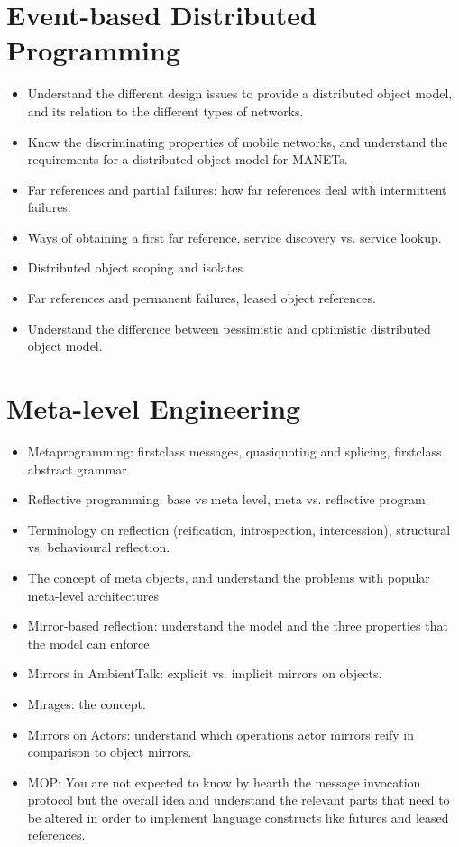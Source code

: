 \documentclass[a4paper]{report}
\begin{document}
\chapter{Event-based Distributed Programming}
\begin{itemize}
  \item Understand the different design issues to provide a distributed object model, and its
  relation to the different types of networks.
  \item Know the discriminating properties of mobile networks, and understand the
  requirements for a distributed object model for MANETs.
  \item Far references and partial failures: how far references deal with intermittent failures.
  \item Ways of obtaining a first far reference, service discovery vs. service lookup.
  \item Distributed object scoping and isolates.
  \item Far references and permanent failures, leased object references.
  \item Understand the difference between pessimistic and optimistic distributed object model.
\end{itemize}


\chapter{Meta-level Engineering}
\begin{itemize}
  \item Metaprogramming: firstclass messages, quasiquoting and splicing, firstclass abstract
  grammar
  \item Reflective programming: base vs meta level, meta vs. reflective program.
  \item Terminology on reflection (reification, introspection, intercession), structural vs.
  behavioural reflection.
  \item The concept of meta objects, and understand the problems with popular meta-level
  architectures
  \item Mirror-based reflection: understand the model and the three properties that the model
  can enforce.
  \item Mirrors in AmbientTalk: explicit vs. implicit mirrors on objects.
  \item Mirages: the concept.
  \item Mirrors on Actors: understand which operations actor mirrors reify in comparison to
  object mirrors.
  \item MOP: You are not expected to know by hearth the message invocation protocol but
  the overall idea and understand the relevant parts that need to be altered in order to
  implement language constructs like futures and leased references.
\end{itemize}
\end{document}
